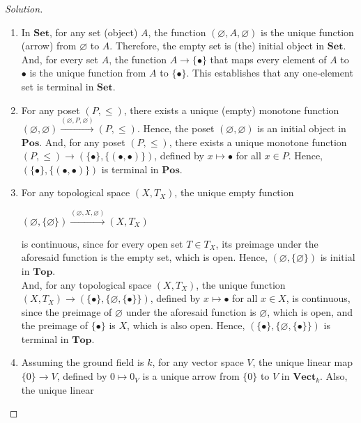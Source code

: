 \documentclass[]{amsbook}
\newcommand{\catname}[1]{\mathbf{#1}}
\newcommand{\0}{\mathbf{0}}
\newcommand{\1}{\mathbf{1}}
\renewcommand{\emptyset}{\varnothing}
\newenvironment{solution}
    {\begin{proof}[Solution]}{\end{proof}}
\begin{document}
\begin{solution}
    \leavevmode
    \begin{enumerate}
       \item In $\catname{Set}$, for any set (object) $A$, the function
       $(\emptyset, A, \emptyset)$ is the unique function (arrow) from
       $\emptyset$ to $A$. Therefore, the empty set is (the) initial object in
       $\catname{Set}$. And, for every set $A$, the function $A \to
       \{ \bullet \}$ that maps every element of $A$ to $\bullet$ is the unique
       function from $A$ to $\{ \bullet \}$. This establishes that any
       one-element set is terminal in $\catname{Set}$.
       \item For any poset $(P, \le)$, there exists a unique (empty) monotone
       function $(\emptyset, \emptyset) \xrightarrow{(\emptyset, P, \emptyset)}
       (P, \le)$. Hence, the poset $(\emptyset, \emptyset)$ is an initial object
       in $\catname{Pos}$. And, for any poset $(P, \le)$, there exists a unique
       monotone function $(P, \le) \to (\{ \bullet \}, \{ (\bullet, \bullet) \})$,
       defined by $x \mapsto \bullet$ for all $x \in P$. Hence, $(\{ \bullet \},
       \{ (\bullet, \bullet) \})$ is terminal in $\catname{Pos}$.
       \item For any topological space $(X, T_X)$, the unique empty function
       \begin{center}
           $(\emptyset, \{ \emptyset \}) \xrightarrow{(\emptyset, X, \emptyset)}
           (X, T_X)$
       \end{center}
       is continuous, since for every open set $T \in T_X$, its preimage under
       the aforesaid function is the empty set, which is open. Hence,
       $(\emptyset, \{ \emptyset \})$ is initial in $\catname{Top}$.\\
       And, for any topological space $(X, T_X)$, the unique function
       $(X, T_X) \to (\{ \bullet \}, \{ \emptyset, \{ \bullet \} \})$, defined by
       $x \mapsto \bullet$ for all $x \in X$, is continuous, since the preimage
       of $\emptyset$ under the aforesaid function is $\emptyset$, which is open,
       and the preimage of $\{ \bullet \}$ is $X$, which is also open. Hence,
       $(\{ \bullet \}, \{ \emptyset, \{ \bullet \} \})$ is terminal in
       $\catname{Top}$.
       \item Assuming the ground field is $k$, for any vector space $V$, the
       unique linear map $\{ 0 \} \to V$, defined by $0 \mapsto 0_V$ is a unique
       arrow from $\{ 0 \}$ to $V$ in $\catname{Vect}_k$. Also, the unique linear

\end{enumerate}
\end{solution}
\end{document}

